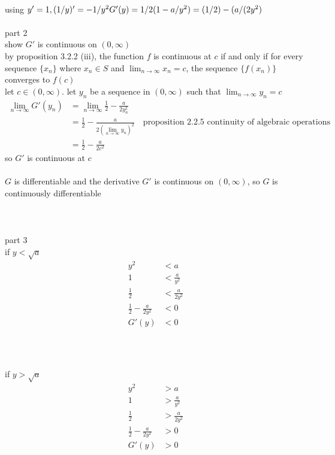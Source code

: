 \documentclass[12pt, border = 4pt, multi]{article} %
\begin{document}
\\
using $y' = 1, (1 / y)' = -1 / y ^ 2\\
G'(y) = 1 / 2(1 - a / y ^ 2)\\
= (1 / 2) - (a / (2 y ^ 2)$\\
\\
part 2\\
show $G'$ is continuous on $(0, \infty)$\\
by proposition 3.2.2 (iii), the function $f$ is continuous at $c$ if and only if for every sequence $\{x_n\}$ where $x_n \in S$ and
$\lim_{n \rightarrow \infty} x_n = c$, the sequence $\{f(x_n)\}$ converges to $f(c)$\\
let $c \in (0, \infty)$. let ${y_n}$ be a sequence in $(0, \infty)$ such that $\lim_{n \rightarrow \infty} y_n = c$\\
\begin{align*}
\lim_{n \rightarrow \infty} G'(y_n) &= \lim_{n \rightarrow \infty} \frac{1}{2} - \frac{a}{2y_n ^ 2}\\
&= \frac{1}{2} - \frac{a}{2(\lim_{n \rightarrow \infty}y_n) ^ 2} \quad \text{proposition 2.2.5 continuity of algebraic operations}\\
&= \frac{1}{2} - \frac{a}{2 c ^ 2}
\end{align*}
so $G'$ is continuous at $c$\\
\\
$G$ is differentiable and the derivative $G'$ is continuous on $(0, \infty)$, so $G$ is continuously differentiable\\
\\
\\
\\
part 3\\
if $y < \sqrt{a}$
\begin{align*}
y ^ 2 &< a\\
1 &< \frac{a}{y ^ 2}\\
\frac{1}{2} &< \frac{a}{2y ^ 2}\\
\frac{1}{2} - \frac{a}{2y ^ 2} &< 0\\
G'(y) &< 0\\
\end{align*}
\\
\\
\\
if $y > \sqrt{a}$
\begin{align*}
y ^ 2 &> a\\
1 &> \frac{a}{y ^ 2}\\
\frac{1}{2} &> \frac{a}{2y ^ 2}\\
\frac{1}{2} - \frac{a}{2y ^ 2} &> 0\\
G'(y) &> 0\\
\end{align*}
\end{document}
